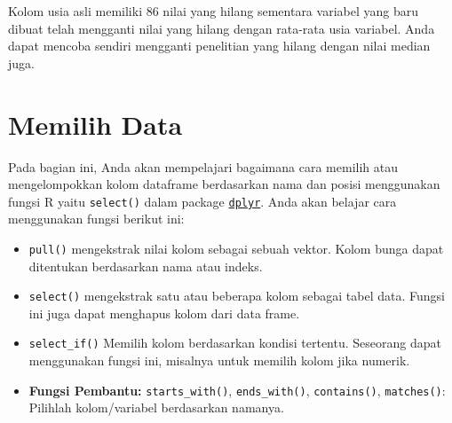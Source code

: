 \documentclass[
]{book}
\providecommand{\tightlist}{%
  \setlength{\itemsep}{0pt}\setlength{\parskip}{0pt}}
\begin{document}
Kolom usia asli memiliki 86 nilai yang hilang sementara variabel yang baru dibuat telah mengganti nilai yang hilang dengan rata-rata usia variabel. Anda dapat mencoba sendiri mengganti penelitian yang hilang dengan nilai median juga.

\hypertarget{memilih-data}{%
\section{Memilih Data}\label{memilih-data}}

Pada bagian ini, Anda akan mempelajari bagaimana cara memilih atau mengelompokkan kolom dataframe berdasarkan nama dan posisi menggunakan fungsi R yaitu \texttt{select()} dalam package \href{https://dplyr.tidyverse.org/reference/summarise.html}{\texttt{dplyr}}. Anda akan belajar cara menggunakan fungsi berikut ini:

\begin{itemize}
\tightlist
\item
  \texttt{pull()} mengekstrak nilai kolom sebagai sebuah vektor. Kolom bunga dapat ditentukan berdasarkan nama atau indeks.
\item
  \texttt{select()} mengekstrak satu atau beberapa kolom sebagai tabel data. Fungsi ini juga dapat menghapus kolom dari data frame.
\item
  \texttt{select\_if()} Memilih kolom berdasarkan kondisi tertentu. Seseorang dapat menggunakan fungsi ini, misalnya untuk memilih kolom jika numerik.
\item
  \textbf{Fungsi Pembantu:} \texttt{starts\_with()}, \texttt{ends\_with()}, \texttt{contains()}, \texttt{matches()}: Pilihlah kolom/variabel berdasarkan namanya.
\end{itemize}
\end{document}
